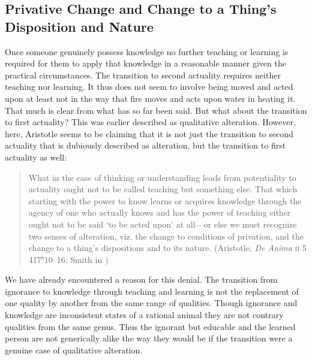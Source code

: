 
\subsection{Privative Change and Change to a Thing's Disposition and Nature} %
\label{sub:privative_and_nonprivative_change}

Once someone genuinely possess knowledge no further teaching or learning is required for them to apply that knowledge in a reasonable manner given the practical circumstances. The transition to second actuality requires neither teaching nor learning. It thus does not seem to involve being moved and acted upon at least not in the way that fire moves and acts upon water in heating it. That much is clear from what has so far been said. But what about the transition to first actuality? This was earlier described as qualitative alteration. However, here, Aristotle seems to be claiming that it is not just the transition to second actuality that is dubiously described as alteration, but the transition to first actuality as well:
\begin{quote}
	What in the case of thinking or understanding leads from potentiality to actuality ought not to be called teaching but something else. That which starting with the power to know learns or acquires knowledge through the agency of one who actually knows and has the power of teaching either ought not to be said `to be acted upon' at all---or else we must recognize two senses of alteration, viz. the change to conditions of privation, and the change to a thing's dispositions and to its nature. (Aristotle, \emph{De Anima} \textsc{ii} 5 417\( ^{b} \)10--16; Smith in \citealt[30--31]{Barnes:1984uq})
\end{quote}
We have already encountered a reason for this denial. The transition from ignorance to knowledge through teaching and learning is not the replacement of one quality by another from the same range of qualities. Though ignorance and knowledge are inconsistent states of a rational animal they are not contrary qualities from the same genus. Thus the ignorant but educable and the learned person are not generically alike the way they would be if the transition were a genuine case of qualitative alteration. 

